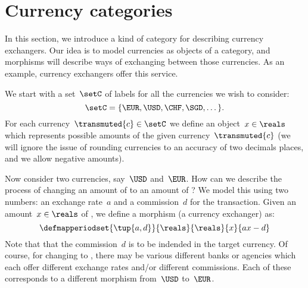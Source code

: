 
\section{Currency categories}
\label{sec:currency_cat}
In this section, we introduce a kind of category for describing currency exchangers.
Our idea is to model currencies as objects of a category, and morphisms will describe ways of exchanging between those currencies.
As an example, currency exchangers offer this service.

We start with a set~$\setC$ of labels for all the currencies we wish to consider:
\begin{equation*}
	\setC = \{ \EUR, \USD, \CHF, \SGD, \dots \}.
\end{equation*}
For each currency~$\transmuted{c} \in \setC$ we define an object~$x\in \reals$ which represents possible amounts of the given currency~$\transmuted{c}$ (we will ignore the issue of rounding currencies to an accuracy of two decimals places, and we allow negative amounts).


Now consider two currencies, say~$\USD$ and~$\EUR$.
How can we describe the process of changing an amount of \USD to an amount of \EUR?
We model this using two numbers: an exchange rate~$a$ and a commission~$d$ for the transaction.
Given an amount~$x \in \reals$ of \USD, we define a morphism (a currency exchanger) as:
\begin{equation*}
	\label{eq:def_curr_ex}
	\defmapperiodset{\tup{a,d}}{\reals}{\reals}{x}{ax-d}
\end{equation*}
Note that that the commission~$d$ is to be indended in the target currency.
Of course, for changing \USD to \EUR, there may be various different banks or agencies which each offer different exchange rates and/or different commissions.
Each of these corresponds to a different morphism from~$\USD$ to~$\EUR$.

